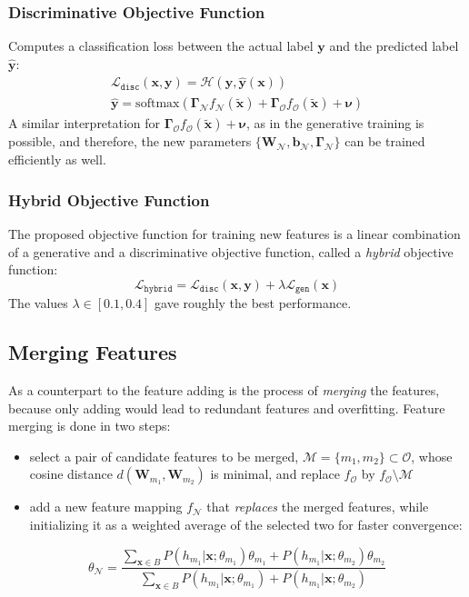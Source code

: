 \documentclass[a4paper,twocolumn]{article}
\renewcommand{\H}{\mathcal{H}}
\newcommand{\N}{\mathcal{N}}
\renewcommand{\L}{\mathcal{L}}
\renewcommand{\O}{\mathcal{O}}
\newcommand{\Lhybrid}{\L_{\mathtt{hybrid}}}
\newcommand{\Ldisc}{\L_{\mathtt{disc}}}
\newcommand{\Lgen}{\L_{\mathtt{gen}}}
\let\originalnu\nu
\renewcommand{\nu}{\boldsymbol{\originalnu}}
\begin{document}
\subsubsection{Discriminative Objective Function}
Computes a classification loss between the actual label $\mathbf{y}$ and the predicted label $\mathbf{\widehat{y}}$:
\begin{gather}
    \Ldisc(\mathbf{x}, \mathbf{y}) = \H(\mathbf{y}, \mathbf{\widehat{y}}(\mathbf{x})) \\
    \mathbf{\widehat{y}} = \mathrm{softmax}(\mathbf{\Gamma_\N}f_\N(\mathbf{\widetilde{x}}) + \mathbf{\Gamma_\O}f_\O(\mathbf{\widetilde{x}}) + \nu)
\end{gather}
A similar interpretation for $\mathbf{\Gamma_\O}f_\O(\mathbf{\widetilde{x}}) + \nu$, as in the generative training is possible, and therefore, the new parameters $\{\mathbf{W_\N, b_\N, \Gamma_\N}\}$ can be trained efficiently as well.

\subsubsection{Hybrid Objective Function}
The proposed objective function for training new features is a linear combination of a generative and a discriminative objective function, called a \textit{hybrid} objective function:
\begin{equation}
    \Lhybrid = \Ldisc(\mathbf{x}, \mathbf{y}) + \lambda\Lgen(\mathbf{x})
\end{equation}
The values $\lambda \in [0.1, 0.4]$ gave roughly the best performance.

\subsection{Merging Features} \label{ssec:merging}
As a counterpart to the feature adding is the process of \textit{merging} the features, because only adding would lead to redundant features and overfitting.
Feature merging is done in two steps:
\begin{itemize}
    \item select a pair of candidate features to be merged, $\mathcal{M} = \{m_1, m_2\} \subset \O$, whose cosine distance $d(\textbf{W}_{m_1}, \textbf{W}_{m_2})$ is minimal, and replace $f_\O$ by $f_\O \setminus \mathcal{M}$
    \item add a new feature mapping $f_\N$ that \textit{replaces} the merged features, while initializing it as a weighted average of the selected two for faster convergence:
\end{itemize}
\begin{equation}
    \theta_\N = \frac{\sum_{\mathbf{x} \in B} P(h_{m_1}|\mathbf{x};\theta_{m_1})\theta_{m_1} + P(h_{m_1}|\mathbf{x};\theta_{m_2})\theta_{m_2}}
    {\sum_{\mathbf{x} \in B} P(h_{m_1}|\mathbf{x};\theta_{m_1}) + P(h_{m_1}|\mathbf{x};\theta_{m_2})}
\end{equation}
\end{document}
